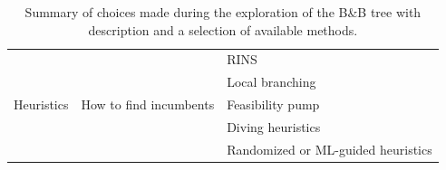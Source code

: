 \begin{table}[H]
\begin{tabular}{l|l|l}
        \multirow{5}{*}{Heuristics}         & \multirow{5}{*}{How to find incumbents} 
        & RINS \\
        & & Local branching \\
        & & Feasibility pump \\
        & & Diving heuristics \\
        & & Randomized or ML-guided heuristics \\ \hline
    \end{tabular}
    \caption{Summary of choices made during the exploration of the B\&B tree with description and a selection of available methods.}
    \label{tab:branch_and_bound_choices}
\end{table}